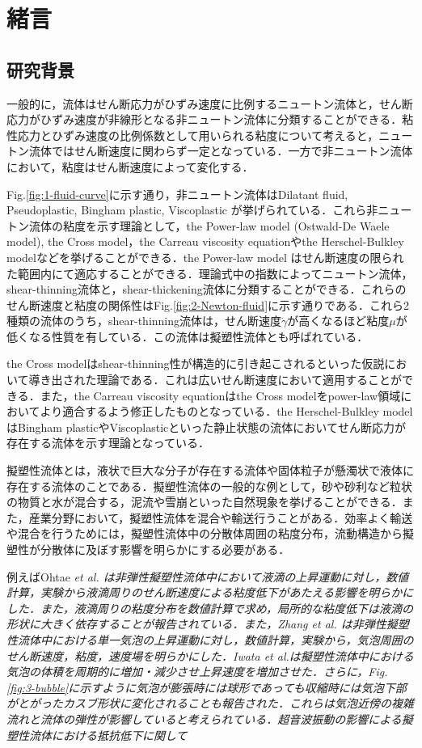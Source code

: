 \chapter{緒言}

\section{研究背景}
一般的に，流体はせん断応力がひずみ速度に比例するニュートン流体と，せん断応力がひずみ速度が非線形となる非ニュートン流体に分類することができる．粘性応力とひずみ速度の比例係数として用いられる粘度について考えると，ニュートン流体ではせん断速度に関わらず一定となっている．一方で非ニュートン流体において，粘度はせん断速度によって変化する．

Fig.\ref{fig:1-fluid-curve}に示す通り，非ニュートン流体はDilatant fluid, Pseudoplastic, Bingham plastic, Viscoplastic が挙げられている．これら非ニュートン流体の粘度を示す理論として，the Power-law model (Ostwald-De Waele model), the Cross model，the Carreau viscosity equationやthe Herschel-Bulkley modelなどを挙げることができる\cite{ref:1}．the Power-law model はせん断速度の限られた範囲内にて適応することができる．理論式中の指数によってニュートン流体，shear-thinning流体と，shear-thickening流体に分類することができる．これらのせん断速度と粘度の関係性はFig.\ref{fig:2-Newton-fluid}に示す通りである．これら2種類の流体のうち，shear-thinning流体は，せん断速度$\dot{\gamma}$が高くなるほど粘度$\mu$が低くなる性質を有している．この流体は擬塑性流体とも呼ばれている．

the Cross modelはshear-thinning性が構造的に引き起こされるといった仮説において導き出された理論である．これは広いせん断速度において適用することができる．また，the Carreau viscosity equationはthe Cross modelをpower-law領域においてより適合するよう修正したものとなっている．the Herschel-Bulkley modelはBingham plasticやViscoplasticといった静止状態の流体においてせん断応力が存在する流体を示す理論となっている\cite{ref:1}．

擬塑性流体とは，液状で巨大な分子が存在する流体や固体粒子が懸濁状で液体に存在する流体のことである．擬塑性流体の一般的な例として，砂や砂利など粒状の物質と水が混合する，泥流や雪崩といった自然現象を挙げることができる．また，産業分野において，擬塑性流体を混合や輸送行うことがある．効率よく輸送や混合を行うためには，擬塑性流体中の分散体周囲の粘度分布，流動構造から擬塑性が分散体に及ぼす影響を明らかにする必要がある．

例えばOhtae \it{et al}. \cite{ref:2}は非弾性擬塑性流体中において液滴の上昇運動に対し，数値計算，実験から液滴周りのせん断速度による粘度低下があたえる影響を明らかにした．また，液滴周りの粘度分布を数値計算で求め，局所的な粘度低下は液滴の形状に大きく依存することが報告されている\cite{ref:3}．また，Zhang \it{et al}. \cite{ref:4}は非弾性擬塑性流体中における単一気泡の上昇運動に対し，数値計算，実験から，気泡周囲のせん断速度，粘度，速度場を明らかにした．Iwata et al.\cite{ref:5}は擬塑性流体中における気泡の体積を周期的に増加・減少させ上昇速度を増加させた．さらに，Fig.\ref{fig:3-bubble}に示すように気泡が膨張時には球形であっても収縮時には気泡下部がとがったカスブ形状に変化されることも報告された．これらは気泡近傍の複雑流れと流体の弾性が影響していると考えられている．超音波振動の影響による擬塑性流体における抵抗低下に関して


